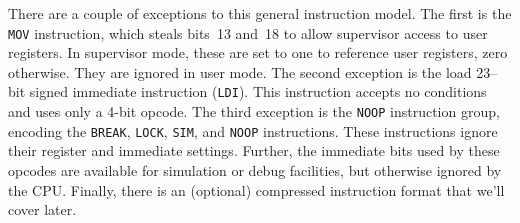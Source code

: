 \documentclass{gqtekspec}
\begin{document}
There are a couple of exceptions to this general instruction model.  The
first is the {\tt MOV} instruction, which steals bits~13 and~18
to allow supervisor access to user registers.  In supervisor mode, these
are set to one to reference user registers, zero otherwise.  They are ignored
in user mode.  The second exception is the load 23--bit
signed immediate instruction ({\tt LDI}).  This instruction accepts no
conditions and uses only a 4-bit opcode.  The third exception is the
{\tt NOOP} instruction group, encoding the {\tt BREAK}, {\tt LOCK},
{\tt SIM}, and {\tt NOOP} instructions.  These instructions ignore their
register and immediate settings.  Further, the immediate bits used by these
opcodes are available for simulation or debug facilities, but otherwise
ignored by the CPU.  Finally, there is an (optional) compressed instruction
format that we'll cover later.
\end{document}
